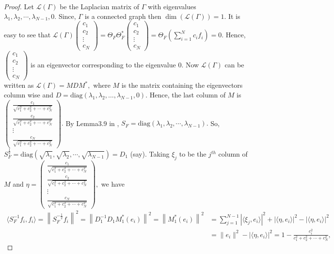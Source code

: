 \documentclass[final,1p,times]{elsarticle}
\begin{document}
\begin{proof}
	Let $\mathcal{L}(\Gamma)$ be the Laplacian matrix of $\Gamma$ with eigenvalues $\lambda_1, \lambda_2, \cdots, \lambda_{N-1}, 0.$ Since, $\Gamma$ is a connected graph then $\dim{(\mathcal{L}(\Gamma))} = 1.$ It is easy to see that $\mathcal{L}(\Gamma) \begin{pmatrix} c_1\\c_2\\ \vdots \\c_N \end{pmatrix} = \Theta_F \Theta_F^{*} \begin{pmatrix} c_1\\c_2\\ \vdots \\c_N \end{pmatrix}  = \Theta_F(\sum\limits_{i=1}^N c_i f_i ) = 0.$ Hence, $ \begin{pmatrix} c_1\\c_2\\ \vdots \\c_N \end{pmatrix} $ is an eigenvector corresponding to the eigenvalue $0.$ Now $\mathcal{L}(\Gamma)$ can be written as $\mathcal{L}(\Gamma) = MDM^*,$ where $M$ is the matrix containing the eigenvectors column wise and  $D = \text{diag}(\lambda_1,\lambda_2, \ldots, \lambda_{N-1},0).$ Hence, the last column of $M$ is  $ \begin{pmatrix} \frac{c_1}{\sqrt{c_{1}^2 + c_{2}^2 + \cdots + c_{N}^2}}\\\frac{c_2}{\sqrt{c_{1}^2 + c_{2}^2 + \cdots + c_{N}^2}}\\ \vdots \\\frac{c_N}{\sqrt{c_{1}^2 + c_{2}^2 + \cdots + c_{N}^2}} \end{pmatrix} .$ By Lemma3.9 in \cite{deep1},  $S_F = \text{diag}(\lambda_1, \lambda_2, \cdots, \lambda_{N-1}).$ So, $S_{F}^{\frac{1}{2}} = \text{diag}(\sqrt{\lambda_1}, \sqrt{\lambda_2}, \cdots, \sqrt{\lambda_{N-1}})= D_1$ (say). Taking $\xi_{j}$ to be the $j^{th}$ column of $M$ and $\eta = \begin{pmatrix} \frac{c_1}{\sqrt{c_{1}^2 + c_{2}^2 + \cdots + c_{N}^2}}\\\frac{c_2}{\sqrt{c_{1}^2 + c_{2}^2 + \cdots + c_{N}^2}}\\ \vdots \\\frac{c_N}{\sqrt{c_{1}^2 + c_{2}^2 + \cdots + c_{N}^2}} \end{pmatrix}, $  we have
	\begin{align*}
		\langle  S_{F}^{-1}f_i, f_i \rangle = \left\|  S_{F}^{-\frac{1}{2}}f_i    \right\|^2 = \left\| D_{1}^{-1} D_{1} M_{1}^{*}(e_i)  \right\|^2 = \left\| M_{1}^{*}(e_i)  \right\|^2 &= \sum\limits_{j=1}^{N-1}|\langle \xi_j, e_i \rangle |^2 + |\langle \eta, e_i \rangle |^2 -  |\langle \eta, e_i \rangle |^2 \\&= \|e_i\|^2 -  |\langle \eta, e_i \rangle |^2  = 1- \frac{c_{i}^2}{c_{1}^2 + c_{2}^2 + \cdots + c_{N}^2}, 

\end{align*}
\end{proof}
\end{document}
